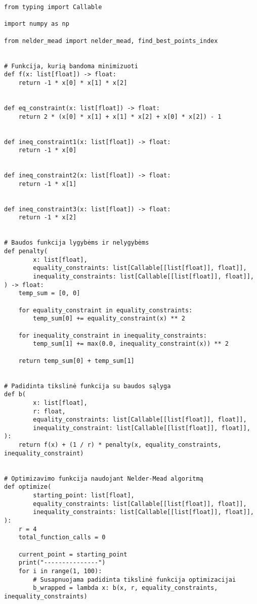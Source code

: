 \documentclass[a4paper,12pt,fleqn]{article}
\begin{document}
\begin{verbatim}
from typing import Callable

import numpy as np

from nelder_mead import nelder_mead, find_best_points_index


# Funkcija, kurią bandoma minimizuoti
def f(x: list[float]) -> float:
    return -1 * x[0] * x[1] * x[2]


def eq_constraint(x: list[float]) -> float:
    return 2 * (x[0] * x[1] + x[1] * x[2] + x[0] * x[2]) - 1


def ineq_constraint1(x: list[float]) -> float:
    return -1 * x[0]


def ineq_constraint2(x: list[float]) -> float:
    return -1 * x[1]


def ineq_constraint3(x: list[float]) -> float:
    return -1 * x[2]


# Baudos funkcija lygybėms ir nelygybėms
def penalty(
        x: list[float],
        equality_constraints: list[Callable[[list[float]], float]],
        inequality_constraints: list[Callable[[list[float]], float]],
) -> float:
    temp_sum = [0, 0]

    for equality_constraint in equality_constraints:
        temp_sum[0] += equality_constraint(x) ** 2

    for inequality_constraint in inequality_constraints:
        temp_sum[1] += max(0.0, inequality_constraint(x)) ** 2

    return temp_sum[0] + temp_sum[1]


# Padidinta tikslinė funkcija su baudos sąlyga
def b(
        x: list[float],
        r: float,
        equality_constraints: list[Callable[[list[float]], float]],
        inequality_constraint: list[Callable[[list[float]], float]],
):
    return f(x) + (1 / r) * penalty(x, equality_constraints, inequality_constraint)


# Optimizavimo funkcija naudojant Nelder-Mead algoritmą
def optimize(
        starting_point: list[float],
        equality_constraints: list[Callable[[list[float]], float]],
        inequality_constraints: list[Callable[[list[float]], float]],
):
    r = 4
    total_function_calls = 0

    current_point = starting_point
    print("---------------")
    for i in range(1, 100):
        # Susapnuojama padidinta tikslinė funkcija optimizacijai
        b_wrapped = lambda x: b(x, r, equality_constraints, inequality_constraints)


\end{verbatim}
\end{document}
